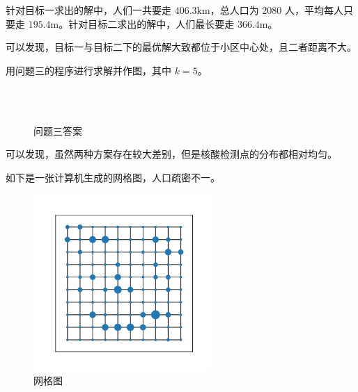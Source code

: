 \documentclass{cumcmthesis}
\begin{document}
针对目标一求出的解中，人们一共要走 $406.3\mathrm{km}$，总人口为 $2080$ 人，平均每人只要走 $195.4\mathrm{m}$。针对目标二求出的解中，人们最长要走 $366.4\mathrm{m}$。

可以发现，目标一与目标二下的最优解大致都位于小区中心处，且二者距离不大。\newpage

用问题三的程序进行求解并作图，其中 $k=5$。

\begin{figure}[H]
	\centering
	\\
	\\	
	\caption{问题三答案}
\end{figure}

可以发现，虽然两种方案存在较大差别，但是核酸检测点的分布都相对均匀。

\newpage
如下是一张计算机生成的网格图，人口疏密不一。

\begin{figure}[H]
	\centering
	\includegraphics[width=0.6\textwidth]{images/graph_Face.png}
	\caption{网格图}
\end{figure}
\end{document}
